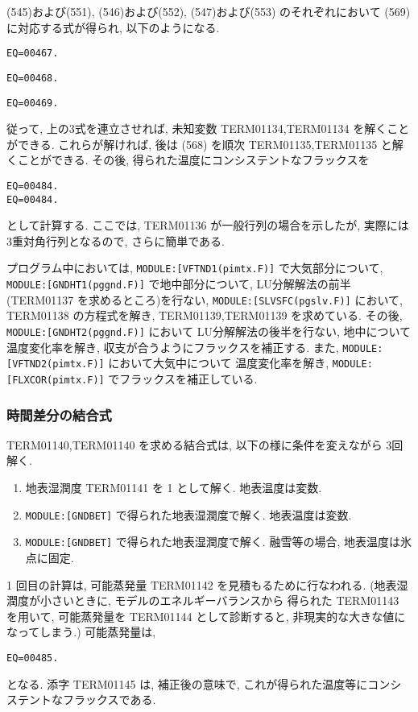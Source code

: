 (545)および(551), 
(546)および(552), 
(547)および(553)  のそれぞれにおいて
(569) に対応する式が得られ, 以下のようになる.

\begin{verbatim}
EQ=00467.
\end{verbatim}
\begin{verbatim}
EQ=00468.
\end{verbatim}
\begin{verbatim}
EQ=00469.
\end{verbatim}

従って, 上の3式を連立させれば,
未知変数 TERM01134,TERM01134 を解くことができる.
これらが解ければ, 後は
(568) を順次 TERM01135,TERM01135 と解くことができる.
%
その後, 得られた温度にコンシステントなフラックスを
\begin{verbatim}
EQ=00484.
EQ=00484.
\end{verbatim}
として計算する.
%
ここでは, TERM01136 が一般行列の場合を示したが,
実際には3重対角行列となるので, さらに簡単である.

プログラム中においては,
\texttt{MODULE:[VFTND1(pimtx.F)]} で大気部分について,
\texttt{MODULE:[GNDHT1(pggnd.F)]} で地中部分について, LU分解解法の前半
(TERM01137 を求めるところ)を行ない, 
\texttt{MODULE:[SLVSFC(pgslv.F)]} において, TERM01138 の方程式を解き,
TERM01139,TERM01139 を求めている.
その後, \texttt{MODULE:[GNDHT2(pggnd.F)]} において
LU分解解法の後半を行ない, 地中について温度変化率を解き, 
収支が合うようにフラックスを補正する.
また, \texttt{MODULE:[VFTND2(pimtx.F)]} において大気中について
温度変化率を解き, 
\texttt{MODULE:[FLXCOR(pimtx.F)]} でフラックスを補正している.

\subsubsection{時間差分の結合式}

TERM01140,TERM01140 を求める結合式は, 
以下の様に条件を変えながら 3回解く. 
\begin{enumerate}
\item 地表湿潤度 TERM01141 を 1 として解く. 地表温度は変数. 
\item \texttt{MODULE:[GNDBET]} で得られた地表湿潤度で解く. 
      地表温度は変数.
\item \texttt{MODULE:[GNDBET]} で得られた地表湿潤度で解く. 
      融雪等の場合, 地表温度は氷点に固定. 
\end{enumerate}

1 回目の計算は, 可能蒸発量 TERM01142 を見積もるために行なわれる.
(地表湿潤度が小さいときに, モデルのエネルギーバランスから
得られた TERM01143 を用いて, 可能蒸発量を
TERM01144
として診断すると, 非現実的な大きな値になってしまう.)
可能蒸発量は,
\begin{verbatim}
EQ=00485.
\end{verbatim}
となる.
添字 TERM01145 は, 補正後の意味で, 
これが得られた温度等にコンシステントなフラックスである.
    
